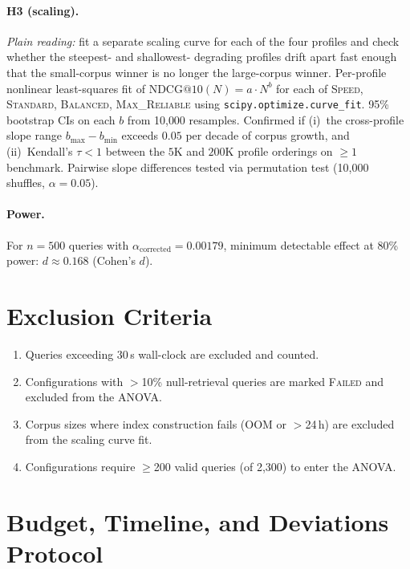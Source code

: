 \documentclass[11pt]{article}
\begin{document}
\paragraph{H3 (scaling).}
\emph{Plain reading:} fit a separate scaling curve for each of the
four profiles and check whether the steepest- and shallowest-
degrading profiles drift apart fast enough that the small-corpus
winner is no longer the large-corpus winner.  Per-profile nonlinear
least-squares fit of $\text{NDCG@10}(N) = a \cdot N^b$ for each of
\textsc{Speed}, \textsc{Standard}, \textsc{Balanced},
\textsc{Max\_Reliable} using \texttt{scipy.optimize.curve\_fit}.
95\% bootstrap CIs on each $b$ from 10{,}000 resamples.  Confirmed
if (i)~the cross-profile slope range $b_{\max} - b_{\min}$ exceeds
$0.05$ per decade of corpus growth, and (ii)~Kendall's
$\tau < 1$ between the $5$K and $200$K profile orderings on
$\geq 1$ benchmark.  Pairwise slope differences tested via
permutation test (10{,}000 shuffles, $\alpha = 0.05$).

\paragraph{Power.}
For $n = 500$ queries with $\alpha_\text{corrected} = 0.00179$,
minimum detectable effect at 80\% power:
$d \approx 0.168$ (Cohen's $d$).

\section{Exclusion Criteria}
\label{sec:exclusion}

\begin{enumerate}[nosep,leftmargin=1.5em]
  \item Queries exceeding 30\,s wall-clock are excluded and counted.
  \item Configurations with $>$10\% null-retrieval queries are marked
    \textsc{Failed} and excluded from the ANOVA.
  \item Corpus sizes where index construction fails (OOM or $>$24\,h)
    are excluded from the scaling curve fit.
  \item Configurations require $\geq$200 valid queries (of 2{,}300)
    to enter the ANOVA.
\end{enumerate}

\section{Budget, Timeline, and Deviations Protocol}
\label{sec:budget}
\end{document}

